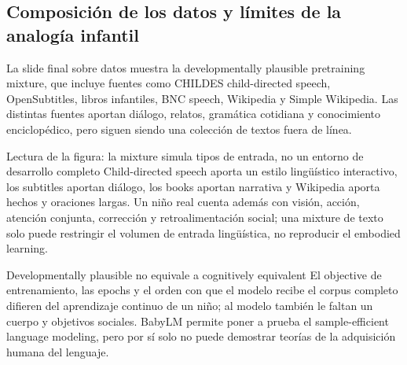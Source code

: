 
\subsection{Composición de los datos y límites de la analogía infantil}

La slide final sobre datos muestra la developmentally plausible pretraining mixture, que incluye fuentes como CHILDES child-directed speech, OpenSubtitles, libros infantiles, BNC speech, Wikipedia y Simple Wikipedia. Las distintas fuentes aportan diálogo, relatos, gramática cotidiana y conocimiento enciclopédico, pero siguen siendo una colección de textos fuera de línea.


\begin{knowledgebox}{Lectura de la figura: la mixture simula tipos de entrada, no un entorno de desarrollo completo}
Child-directed speech aporta un estilo lingüístico interactivo, los subtitles aportan diálogo, los books aportan narrativa y Wikipedia aporta hechos y oraciones largas. Un niño real cuenta además con visión, acción, atención conjunta, corrección y retroalimentación social; una mixture de texto solo puede restringir el volumen de entrada lingüística, no reproducir el embodied learning.
\end{knowledgebox}

\begin{warningbox}{Developmentally plausible no equivale a cognitively equivalent}
El objective de entrenamiento, las epochs y el orden con que el modelo recibe el corpus completo difieren del aprendizaje continuo de un niño; al modelo también le faltan un cuerpo y objetivos sociales. BabyLM permite poner a prueba el sample-efficient language modeling, pero por sí solo no puede demostrar teorías de la adquisición humana del lenguaje.
\end{warningbox}


